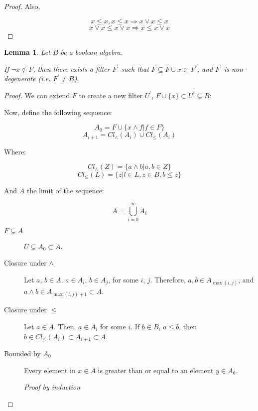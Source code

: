 \documentclass{article}
\newtheorem{lemma}{Lemma}
\begin{document}
\begin{enumerate}
\begin{enumerate}
\begin{proof}
       Also,

       $$ x ≤ x, x ≤ x ⇒ x ∨ x ≤ x$$
       $$ x ∨ x ≤ x ∨ x ⇒ x ≤ x ∨ x$$
     \end{proof}

     \begin{lemma}\label{lem:filter-ext}
       Let $B$ be a boolean algebra.
       
       If $¬x \not \in F$, then there exists a
       filter $F^\prime$ such that $F \subseteq F \cup x \subset F^\prime$,
       and $F^\prime$ is non-degenerate (i.e. $F^\prime \neq B$).
       
    \end{lemma}
    \begin{proof}
           We can extend $F$ to create a new filter $U^\prime$,
           $F \cup \{x\} \subset U^\prime \subsetneq B$:
           
           Now, define the following sequence:

           $$A_0 = F \cup \{ x ∧ f | f ∈ F \}$$
           $$A_{i+1} = Cl_{∧}(A_i) \cup Cl_{≤}(A_i)$$

           Where:

           $$Cl_{∧}(Z) = \{ a ∧ b  \vert a, b \in Z \}$$
           $$Cl_{≤}(L) = \{ z \vert l \in L, z \in B, b ≤ z \}$$

           And $A$ the limit of the sequence:

           $$A = \bigcup_{i=0}^{\infty} A_i$$

           \begin{description}
             \item[$F \subsetneq A$] $U \subsetneq A_0 \subset A$. 
             \item[Closure under $∧$]
               Let $a,\,b \in A$. $a \in A_i$, $b \in A_j$, for some
               $i$, $j$. Therefore,
               $a,b \in A_{\max(i,j)}$, and $a ∧ b \in A_{\max(i,j)+1} \subset A$.

             \item[Closure under $≤$]
               Let $a \in A$. Then, $a \in A_i$ for some $i$. If $b \in B$,
               $a ≤ b$, then $b ∈ Cl_{≤}(A_i) \subset A_{i+1} \subset A$.

             \item[Bounded by $A_0$]
               Every element in $x ∈ A$ is greater than or equal to an element
               $y ∈ A_0$.

               {\em Proof by induction}


\end{description}
\end{proof}
\end{enumerate}
\end{enumerate}
\end{document}

